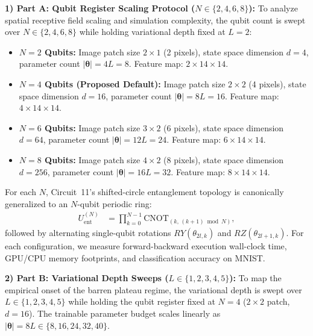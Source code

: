 \documentclass[pdflatex,sn-mathphys-num]{sn-jnl}%
\theoremstyle{thmstyleone}%
\theoremstyle{thmstyletwo}%
\theoremstyle{thmstylethree}%
\begin{document}
\textbf{1) Part A: Qubit Register Scaling Protocol ($N \in \{2, 4, 6, 8\}$):}
To analyze spatial receptive field scaling and simulation complexity, the qubit count is swept over $N \in \{2, 4, 6, 8\}$ while holding variational depth fixed at $L = 2$:
\begin{itemize}
    \item \textbf{$N = 2$ Qubits:} Image patch size $2 \times 1$ (2 pixels), state space dimension $d = 4$, parameter count $|\boldsymbol{\theta}| = 4L = 8$. Feature map: $2 \times 14 \times 14$.
    \item \textbf{$N = 4$ Qubits (Proposed Default):} Image patch size $2 \times 2$ (4 pixels), state space dimension $d = 16$, parameter count $|\boldsymbol{\theta}| = 8L = 16$. Feature map: $4 \times 14 \times 14$.
    \item \textbf{$N = 6$ Qubits:} Image patch size $3 \times 2$ (6 pixels), state space dimension $d = 64$, parameter count $|\boldsymbol{\theta}| = 12L = 24$. Feature map: $6 \times 14 \times 14$.
    \item \textbf{$N = 8$ Qubits:} Image patch size $4 \times 2$ (8 pixels), state space dimension $d = 256$, parameter count $|\boldsymbol{\theta}| = 16L = 32$. Feature map: $8 \times 14 \times 14$.
\end{itemize}
For each $N$, Circuit~11's shifted-circle entanglement topology is canonically generalized to an $N$-qubit periodic ring:
\begin{align}
U_{\mathrm{ent}}^{(N)} &= \prod_{k=0}^{N-1} \mathrm{CNOT}_{(k, \, (k+1)\bmod N)},
\label{eq:n_qubit_cnot_ring}
\end{align}
followed by alternating single-qubit rotations $RY(\theta_{2l, k})$ and $RZ(\theta_{2l+1, k})$. For each configuration, we measure forward-backward execution wall-clock time, GPU/CPU memory footprints, and classification accuracy on MNIST.

\textbf{2) Part B: Variational Depth Sweeps ($L \in \{1, 2, 3, 4, 5\}$):}
To map the empirical onset of the barren plateau regime, the variational depth is swept over $L \in \{1, 2, 3, 4, 5\}$ while holding the qubit register fixed at $N = 4$ ($2 \times 2$ patch, $d = 16$). The trainable parameter budget scales linearly as $|\boldsymbol{\theta}| = 8L \in \{8, 16, 24, 32, 40\}$.
\end{document}
